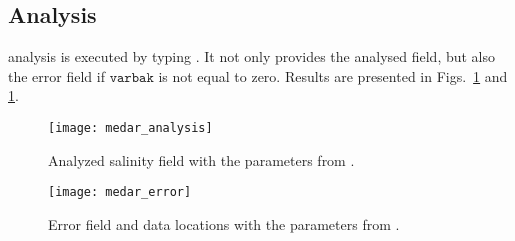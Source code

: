 \subsection{Analysis}

\diva analysis is executed by typing . It not only provides the analysed field, but also the error field if $\texttt{varbak}$ is not equal to zero. Results are presented in Figs.~\ref{analysisCL1} and \ref{analysisCL1}.

\begin{figure}[htpb]
\centering
\texttt{[image: medar\_analysis]}
\caption{Analyzed salinity field with the parameters from .\label{analysisCL1}}
\end{figure}


\begin{figure}[htpb]
\centering
\texttt{[image: medar\_error]}
\caption{Error field and data locations with the parameters from .\label{errorCL1}}
\end{figure}



\clearpage
%




%
%



